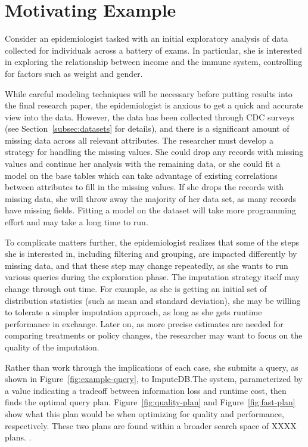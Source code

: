 \section{Motivating Example}
Consider an epidemiologist tasked with an initial
exploratory analysis of data collected for individuals across
a battery of exams. In particular, she is interested in exploring
the relationship between income and the immune system,
controlling for factors such as weight and gender.

While careful modeling techniques will be necessary before putting
results into the final research paper, the epidemiologist is anxious
to get a quick and accurate view into the data. However,
the data has been collected through CDC surveys (see Section~\ref{subsec:datasets} for details),
and there is a significant amount of missing data across all
relevant attributes. The researcher must develop a strategy
for handling the missing values. She could drop any records with
missing values and continue her analysis with the remaining data,
or she could fit a model on the base tables which can take advantage of existing correlations between attributes to fill in the missing values.
If she drops the records with missing data, she will throw away the majority of her data set, as many records have missing fields.
Fitting a model on the dataset will take more programming effort and may take a long time to run.

To complicate matters further, the epidemiologist realizes that
some of the steps she is interested in, including filtering and grouping,
are impacted differently by missing data, and that these step may change
repeatedly, as she wants to run various queries during the exploration phase.
The imputation strategy itself may change through out time. For example, as she is getting an initial
set of distribution statistics (such as mean and standard deviation), she may be willing to tolerate
a simpler imputation approach, as long as she gets runtime performance in exchange. Later on,
as more precise estimates are needed for comparing treatments or policy changes, the researcher
may want to focus on the quality of the imputation.

Rather than work through
the implications of each case, she submits a query, as shown in Figure~\ref{fig:example-query}, to ImputeDB.\@ The system, parameterized by a value indicating
a tradeoff between information loss and runtime cost, then finds
the optimal query plan. Figure~\ref{fig:quality-plan} and Figure~\ref{fig:fast-plan} show what this plan would be
when optimizing for quality and performance, respectively. These two plans are found within a broader search space
of XXXX plans. .

